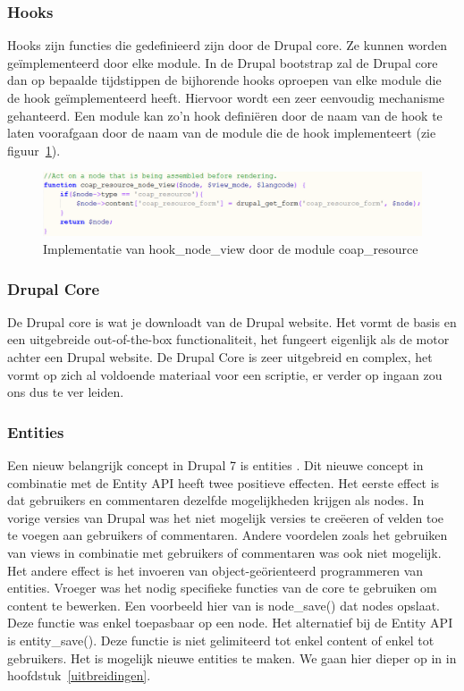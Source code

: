 \subsubsection{Hooks}
Hooks zijn functies die gedefinieerd zijn door de Drupal core. Ze kunnen worden ge\"{i}mplementeerd door elke module. In de Drupal bootstrap zal de Drupal core dan op bepaalde tijdstippen de bijhorende hooks oproepen van elke module die de hook ge\"{i}mplementeerd heeft. Hiervoor wordt een zeer eenvoudig mechanisme gehanteerd. Een module kan zo'n hook defini\"{e}ren door de naam van de hook te laten voorafgaan door de naam van de module die de hook implementeert (zie figuur~\ref{fig:drupalHookExample}).
\begin{figure}[h]
\includegraphics[width=1\textwidth]{fig/drupalHookExample}
\caption{Implementatie van hook\_node\_view door de module coap\_resource}
\label{fig:drupalHookExample}
\end{figure}

\subsubsection{Drupal Core}
De Drupal core is wat je downloadt van de Drupal website. Het vormt de basis en een uitgebreide out-of-the-box functionaliteit, het fungeert eigenlijk als de motor achter een Drupal website. De Drupal Core is zeer uitgebreid en complex, het vormt op zich al voldoende materiaal voor een scriptie, er verder op ingaan zou ons dus te ver leiden.

\subsubsection{Entities}
Een nieuw belangrijk concept in Drupal 7 is entities \cite{entities}. Dit nieuwe concept in combinatie met de Entity API heeft twee positieve effecten. Het eerste effect is dat gebruikers en commentaren dezelfde mogelijkheden krijgen als nodes. In vorige versies van Drupal was het niet mogelijk versies te cre\"{e}eren of velden toe te voegen aan gebruikers of commentaren. Andere voordelen zoals het gebruiken van views in combinatie met gebruikers of commentaren was ook niet mogelijk. Het andere effect is het invoeren van object-ge\"{o}rienteerd programmeren van entities. Vroeger was het nodig specifieke functies van de core te gebruiken om content te bewerken. Een voorbeeld hier van is node\_save() dat nodes opslaat. Deze functie was enkel toepasbaar op een node. Het alternatief bij de Entity API is entity\_save(). Deze functie is niet gelimiteerd tot enkel content of enkel tot gebruikers.
Het is mogelijk nieuwe entities te maken. We gaan hier dieper op in in hoofdstuk~\ref{uitbreidingen}.

